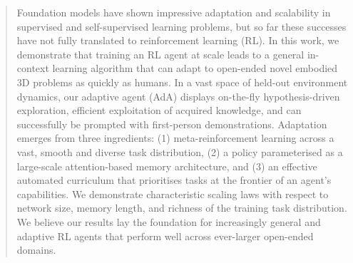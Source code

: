 \begin{abstract}

Foundation models have shown impressive adaptation and scalability in supervised and self-supervised learning problems, but so far these successes have not fully translated to reinforcement learning (RL). In this work, we demonstrate that training an RL agent at scale leads to a general in-context learning algorithm that can adapt to open-ended novel embodied 3D problems as quickly as humans.  In a vast space of held-out environment dynamics, our adaptive agent (AdA) displays on-the-fly hypothesis-driven exploration, efficient exploitation of acquired knowledge, and can successfully be prompted with first-person demonstrations. Adaptation emerges from three ingredients: (1) meta-reinforcement learning across a vast, smooth and diverse task distribution, (2) a policy parameterised as a large-scale attention-based memory architecture, and (3) an effective automated curriculum that prioritises tasks at the frontier of an agent's capabilities. We demonstrate characteristic scaling laws with respect to network size, memory length, and richness of the training task distribution. We believe our results lay the foundation for increasingly general and adaptive RL agents that perform well across ever-larger open-ended domains.  

\end{abstract}